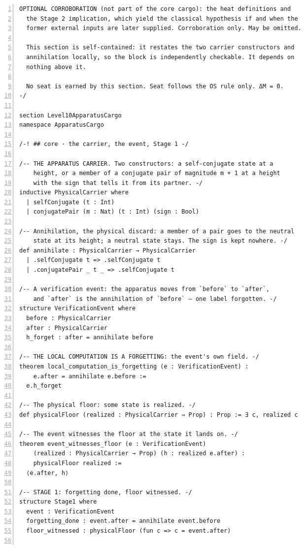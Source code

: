\documentclass[10pt]{article}
\newcommand{\leansize}{\fontsize{5.5pt}{6.75pt}\selectfont}
\begin{document}
\begin{multicols}{2}
\begin{Verbatim}[numbers=left,firstnumber=1,numbersep=3pt,xleftmargin=2.6em,breaklines=true,breakanywhere=true,breakautoindent=false,breakindent=1.4em,breaksymbolleft={},breakanywheresymbolpre={},fontsize=\leansize]
  OPTIONAL CORROBORATION (not part of the core cargo): the heat definitions and
  the Stage 2 implication, which yield the classical hypothesis if and when the
  former external inputs are later supplied. Corroboration only. May be omitted.

  This section is self-contained: it restates the two carrier constructors and
  annihilation locally, so the block is independently checkable. It depends on
  nothing above it.

  No seat is earned by this section. Seat follows the OS rule only. ΔM = 0.
-/

section Level10ApparatusCargo
namespace ApparatusCargo

/-! ## core · the carrier, the event, Stage 1 -/

/-- THE APPARATUS CARRIER. Two constructors: a self-conjugate state at a
    height, or a member of a conjugate pair of magnitude m + 1 at a height
    with the sign that tells it from its partner. -/
inductive PhysicalCarrier where
  | selfConjugate (t : Int)
  | conjugatePair (m : Nat) (t : Int) (sign : Bool)

/-- Annihilation, the physical discard: a member of a pair goes to the neutral
    state at its height; a neutral state stays. The sign is kept nowhere. -/
def annihilate : PhysicalCarrier → PhysicalCarrier
  | .selfConjugate t => .selfConjugate t
  | .conjugatePair _ t _ => .selfConjugate t

/-- A verification event: the apparatus moves from `before` to `after`,
    and `after` is the annihilation of `before` — one label forgotten. -/
structure VerificationEvent where
  before : PhysicalCarrier
  after : PhysicalCarrier
  h_forget : after = annihilate before

/-- THE LOCAL COMPUTATION IS A FORGETTING: the event's own field. -/
theorem local_computation_is_forgetting (e : VerificationEvent) :
    e.after = annihilate e.before :=
  e.h_forget

/-- The physical floor: some state is realized. -/
def physicalFloor (realized : PhysicalCarrier → Prop) : Prop := ∃ c, realized c

/-- The event witnesses the floor at the state it lands on. -/
theorem event_witnesses_floor (e : VerificationEvent)
    (realized : PhysicalCarrier → Prop) (h : realized e.after) :
    physicalFloor realized :=
  ⟨e.after, h⟩

/-- STAGE 1: forgetting done, floor witnessed. -/
structure Stage1 where
  event : VerificationEvent
  forgetting_done : event.after = annihilate event.before
  floor_witnessed : physicalFloor (fun c => c = event.after)


\end{Verbatim}
\end{multicols}
\end{document}

